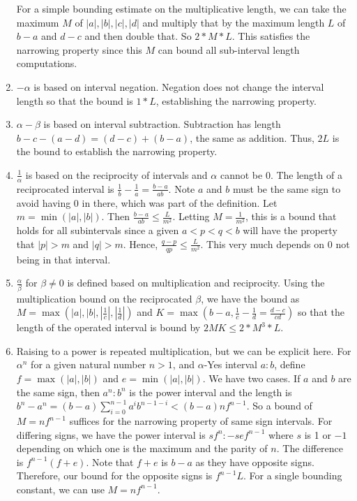 \documentclass[12pt]{article}
\begin{document}
\begin{enumerate}
    For a simple bounding estimate on the multiplicative length, we can take the maximum $M$ of $|a|, |b|, |c|, |d|$ and multiply that by the maximum length $L$ of $b-a$ and $d-c$ and then double that. So $2*M*L$. This satisfies the narrowing property since this $M$ can bound all sub-interval length computations.
    \item $-\alpha$ is based on interval negation. Negation does not change the interval length so that the bound is $1*L$, establishing the narrowing property. 
    \item $\alpha - \beta$ is based on interval subtraction. Subtraction has length $b-c - (a-d) = (d-c) + (b-a)$, the same as addition. Thus, $2L$ is the bound to establish the narrowing property. 
    \item $\frac{1}{\alpha}$ is based on the reciprocity of intervals and $\alpha$ cannot be $0$. The length of a reciprocated interval is $\frac{1}{b} - \frac{1}{a} = \tfrac{b-a}{ab}$. Note $a$ and $b$ must be the same sign to avoid having 0 in there, which was part of the definition. Let $m = \min(|a|, |b|)$. Then $\tfrac{b-a}{ab} \leq \tfrac{L}{m^2}$. Letting $M = \tfrac{1}{m^2}$, this is a bound that holds for all subintervals since a given $a < p < q < b$ will have the property that $|p| > m$ and $|q| > m$. Hence, $\frac{q-p}{qp} \leq \frac{L}{m^2}$. This very much depends on $0$ not being in that interval. 
    \item $\tfrac{\alpha}{\beta}$ for $\beta \neq 0$ is defined based on multiplication and reciprocity. Using the multiplication bound on the reciprocated $\beta$, we have the bound as $M = \max(|a|, |b|, |\frac{1}{c}|, |\frac{1}{d}|)$ and $K= \max(b-a, \frac{1}{c} - \frac{1}{d}= \tfrac{d-c}{cd} )$ so that the length of the operated interval is bound by $2MK \leq 2*M^3*L$.
    \item Raising to a power is repeated multiplication, but we can be explicit here. For $\alpha^n$ for a given natural number $n>1$, and $\alpha$-Yes interval $a:b$, define $f = \max(|a|, |b|)$ and $e=\min(|a|,|b|)$.  We have two cases. If $a$ and $b$ are the same sign, then $a^n:b^n$ is the power interval and the length is $b^n - a^n = (b-a)\sum_{i=0}^{n-1} a^i b^{n-1-i} < (b-a)n f^{n-1}$. So a bound of $M= nf^{n-1}$ suffices for the narrowing property of same sign intervals. For differing signs, we have the power interval is $sf^n:-sef^{n-1}$ where $s$ is 1 or $-1$ depending on which one is the maximum and the parity of $n$. The difference is $f^{n-1} (f+e)$. Note that $f+e$ is $b-a$ as they have opposite signs. Therefore, our bound for the opposite signs is $f^{n-1} L$. For a single bounding constant, we can use $M = n f^{n-1}$.

\end{enumerate}
\end{document}
